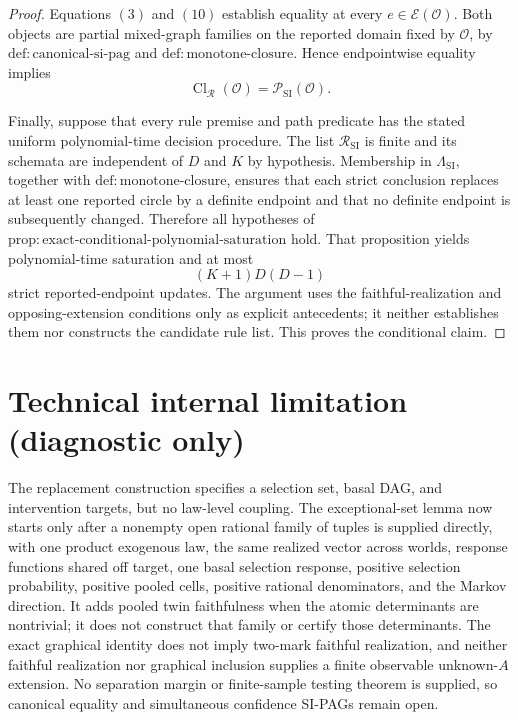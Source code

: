 \documentclass{article}
\begin{document}
\begin{proof}
Equations \((3)\) and \((10)\) establish equality at every \(e\in\mathcal E(\mathcal O)\).  Both objects are partial mixed-graph families on the reported domain fixed by \(\mathcal O\), by \(\mathrm{def:canonical\mbox{-}si\mbox{-}pag}\) and \(\mathrm{def:monotone\mbox{-}closure}\).  Hence endpointwise equality implies
\[
 \operatorname{Cl}_{\mathcal R}(\mathcal O)
 =\mathcal P_{\mathrm{SI}}(\mathcal O).
 \tag{11}
\]

Finally, suppose that every rule premise and path predicate has the stated uniform polynomial-time decision procedure.  The list \(\mathcal R_{\mathrm{SI}}\) is finite and its schemata are independent of \(D\) and \(K\) by hypothesis.  Membership in \(\Lambda_{\mathrm{SI}}\), together with \(\mathrm{def:monotone\mbox{-}closure}\), ensures that each strict conclusion replaces at least one reported circle by a definite endpoint and that no definite endpoint is subsequently changed.  Therefore all hypotheses of \(\mathrm{prop:exact\mbox{-}conditional\mbox{-}polynomial\mbox{-}saturation}\) hold.  That proposition yields polynomial-time saturation and at most
\[
 (K+1)D(D-1)
\]
strict reported-endpoint updates.  The argument uses the faithful-realization and opposing-extension conditions only as explicit antecedents; it neither establishes them nor constructs the candidate rule list.  This proves the conditional claim.
\end{proof}

\section*{Technical internal limitation (diagnostic only)}

The replacement construction specifies a selection set, basal DAG, and intervention targets, but no law-level coupling. The exceptional-set lemma now starts only after a nonempty open rational family of tuples is supplied directly, with one product exogenous law, the same realized vector across worlds, response functions shared off target, one basal selection response, positive selection probability, positive pooled cells, positive rational denominators, and the Markov direction. It adds pooled twin faithfulness when the atomic determinants are nontrivial; it does not construct that family or certify those determinants. The exact graphical identity does not imply two-mark faithful realization, and neither faithful realization nor graphical inclusion supplies a finite observable unknown-\(A\) extension. No separation margin or finite-sample testing theorem is supplied, so canonical equality and simultaneous confidence SI-PAGs remain open.
\end{document}
